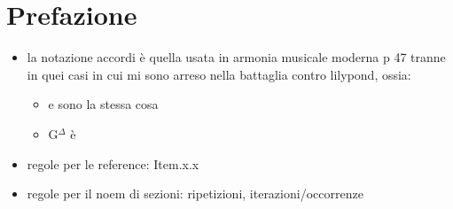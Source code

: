 \documentclass[class=book, crop=false, oneside, 12pt]{standalone}
\begin{document}
\chapter*{Prefazione}

\begin{itemize}
    \item la notazione accordi è quella usata in armonia musicale moderna p 47 tranne in quei casi in cui mi sono arreso nella battaglia contro lilypond, ossia:
    \begin{itemize}
        \item {} e  sono la stessa cosa
        \item G\(^\Delta\) è 
    \end{itemize}
    \item regole per le reference: Item.x.x
    \item regole per il noem di sezioni: ripetizioni, iterazioni/occorrenze
\end{itemize}
\end{document}
